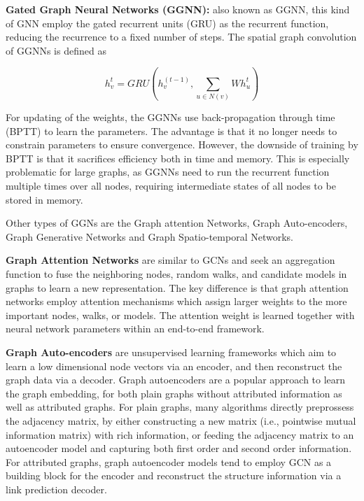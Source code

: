 


\textbf{Gated Graph Neural Networks (GGNN):} also known as GGNN, this kind of GNN employ the gated recurrent units (GRU) \cite{GRU} as the recurrent function, reducing the recurrence to a fixed number of steps. The spatial graph convolution of GGNNs is defined as 

$$ h_v^t = GRU(h_v^{(t-1)}, \sum_{u \in N(v)} Wh_u^t) $$

For updating of the weights, the GGNNs use back-propagation through time (BPTT) to learn the parameters. The advantage is that it no longer needs to constrain parameters to ensure convergence. However, the downside of training by BPTT is that it sacrifices efficiency both in time and memory. This  is especially problematic for large graphs, as GGNNs need to run the recurrent function multiple times over all nodes, requiring intermediate states of all nodes to be stored in memory.



Other types of GGNs are the Graph attention Networks, Graph Auto-encoders, Graph Generative Networks and Graph Spatio-temporal Networks.

\textbf{Graph Attention Networks} are similar to GCNs and seek an aggregation function to fuse the neighboring nodes, random walks, and candidate models in graphs to learn a new representation. The key difference is that graph attention networks employ attention mechanisms which assign larger weights to the more important nodes, walks, or models. The attention weight is learned together with neural network parameters within an end-to-end framework.

\textbf{Graph Auto-encoders} are unsupervised learning frameworks which aim to learn a low dimensional node vectors via an encoder, and then reconstruct the graph data via a decoder. Graph autoencoders are a popular approach to learn the graph embedding, for both plain graphs without attributed information as well as attributed graphs. For plain graphs, many algorithms directly preprossess the adjacency matrix, by either constructing a new matrix (i.e., pointwise mutual information matrix) with rich information, or feeding the adjacency matrix to an autoencoder model and capturing both first order and second order information. For attributed graphs, graph autoencoder models tend to employ GCN as a building
block for the encoder and reconstruct the structure information via a link prediction decoder.

